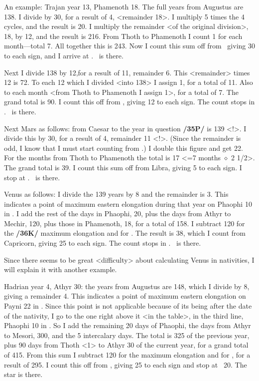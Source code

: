 An example: Trajan year 13, Phamenoth 18. The full years from Augustus are 138. I divide by 30,
for a result of 4, <remainder 18>. I multiply 5 times the 4 cycles, and the result is 20. I multiply the remainder <of the original division>, 18, by 12, and the result is 216. From Thoth to Phamenoth I count 1 for each month—total 7. All together this is 243. Now I count this sum off from \Cancer\, giving 30 to each sign, and I arrive at \Pisces. \Saturn\, is there.

Next I divide 138 by 12,for a result of 11, remainder 6. This <remainder> times 12 is 72. To each 12 which I divided <into 138> I assign 1, for a total of 11. Also to each month <from Thoth to Phamenoth I assign 1>, for a total of 7. The grand total is 90. I count this off from \Taurus, giving 12 to
each sign. The count stops in \Sagittarius. \Jupiter\, is there. 

Next Mars as follows: from Caesar to the year in question \textbf{/35P/} is 139 <!>. I divide this by 30, for a
result of 4, remainder 11 <!>. (Since the remainder is odd, I know that I must start counting from \Libra.) I double this figure and get 22. For the months from Thoth to Phamenoth the total is 17 <=7 months $\diamond$ 2 1/2>. The grand total is 39. I count this sum off from Libra, giving 5 to each sign. I stop at \Taurus. \Mars\, is there.

Venus as follows: I divide the 139 years by 8 and the remainder is 3. This indicates a point of maximum eastern elongation during that year on Phaophi 10 in \Sagittarius. I add the rest of the days in Phaophi, 20, plus the days from Athyr to Mechir, 120, plus those in Phamenoth, 18, for a total of 158. I subtract 120 for the \textbf{/36K/} maximum elongation and for \Sagittarius. The result is 38, which I count from Capricorn, giving 25 to each sign. The count stops in \Aquarius. \Venus\, is there.

Since there seems to be great <difficulty> about calculating Venus in nativities, I will explain it with another example. 

Hadrian year 4, Athyr 30: the years from Augustus are 148, which I divide by 8, giving a remainder 4. This indicates a point of maximum eastern elongation on Payni 22 in \Leo. Since this point is not applicable because of its being after the date of the nativity, I go to the one right above it <in
the table>, in the third line, Phaophi 10 in \Sagittarius. So I add the remaining 20 days of Phaophi, the days from Athyr to Mesori, 300, and the 5 intercalary days. The total is 325 of the previous year, plus 90 days from Thoth <1> to Athyr 30 of the current year, for a grand total of 415. From this sum I subtract 120 for the maximum elongation and for \Sagittarius, for a result of 295. I count this off from \Capricorn,
giving 25 to each sign and stop at \Sagittarius\, 20. The star is there.

